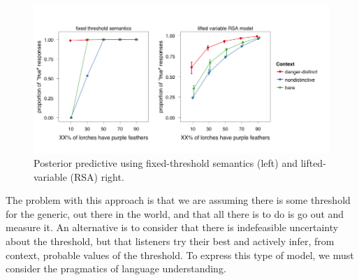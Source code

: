 \documentclass[10pt,letterpaper]{article}
\begin{document}
\begin{figure}
\centering
    \includegraphics[width=\columnwidth]{fig3_2pps}
    \caption{Posterior predictive using fixed-threshold semantics (left) and lifted-variable (RSA) right.}
  \label{fig:bda1posteriorpred}
\end{figure}

The problem with this approach is that we are assuming there is some threshold for the generic, out there in the world, and that all there is to do is go out and measure it. An alternative is to consider that there is indefeasible uncertainty about the threshold, but that listeners try their best and actively infer, from context, probable values of the threshold. To express this type of model, we must consider the pragmatics of language understanding. 
\end{document}
